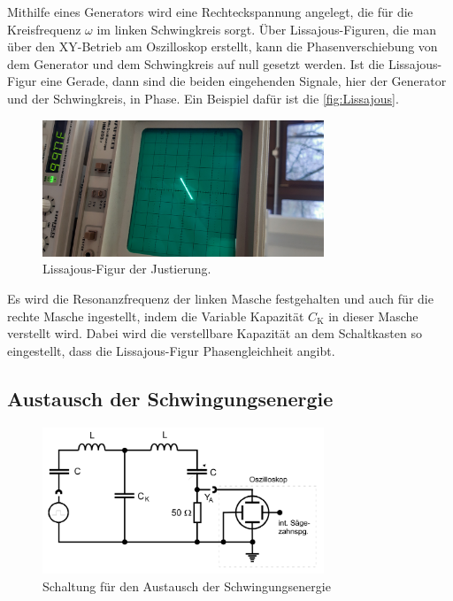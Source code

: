 \noindent Mithilfe eines Generators wird eine Rechteckspannung angelegt, die  für die Kreisfrequenz $\omega$ im linken Schwingkreis sorgt. 
Über Lissajous-Figuren, die man über den XY-Betrieb am Oszilloskop erstellt, kann die Phasenverschiebung von dem Generator und 
dem Schwingkreis auf null gesetzt werden. Ist die Lissajous-Figur eine Gerade, dann sind die beiden eingehenden Signale, hier der
Generator und der Schwingkreis, in Phase. Ein Beispiel dafür ist die \autoref{fig:Lissajous}.
\begin{figure}[H]
    \centering
    \includegraphics[width=0.75\textwidth, angle=-90]{plots/Lissajour-Gerade.jpeg}
    \caption{Lissajous-Figur der Justierung.}
    \label{fig:Lissajous}
\end{figure}

\noindent Es wird die Resonanzfrequenz der linken Masche festgehalten und auch für die rechte Masche ingestellt, indem die Variable Kapazität
$C_{\text{K}}$ in dieser Masche verstellt wird.
Dabei wird die verstellbare Kapazität an dem Schaltkasten so eingestellt, dass die Lissajous-Figur Phasengleichheit angibt.

\subsection{Austausch der Schwingungsenergie}
\begin{figure}[H]
    \centering
    \includegraphics[width=0.75\textwidth]{plots/Schaltung1.png}
    \caption{Schaltung für den Austausch der Schwingungsenergie \cite{Versuchsanleitung}}
    \label{fig:schaltung1}
\end{figure}

